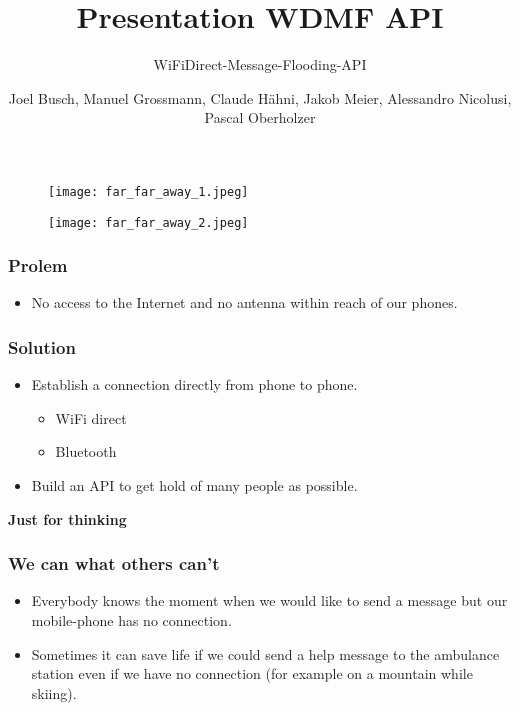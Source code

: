 \documentclass[11pt]{beamer}
\author{Joel Busch, Manuel Grossmann, Claude Hähni, Jakob Meier, Alessandro Nicolusi, Pascal Oberholzer}
\title{Presentation WDMF API}
\subtitle{WiFiDirect-Message-Flooding-API}
\institute{}
\date{}
\begin{document}
	\maketitle
	
	\begin{frame}
		\begin{figure}
			\texttt{[image: far\_far\_away\_1.jpeg]}
		\end{figure}
	\end{frame}
	
	\begin{frame}
		\begin{figure}
			\texttt{[image: far\_far\_away\_2.jpeg]}
		\end{figure}
	\end{frame}
	
	\begin{frame}
		\frametitle{Prolem}
		\begin{itemize}
			\item No access to the Internet and no antenna within reach of our phones.
		\end{itemize}
	\end{frame}
	
	\begin{frame}
		\frametitle{Solution}
		\begin{itemize}
			\item Establish a connection directly from phone to phone.
			\begin{itemize}
				\item WiFi direct
				\item Bluetooth
			\end{itemize}
			\item Build an API to get hold of many people as possible.
		\end{itemize}
	\end{frame}
	
	\begin{frame}
		\textbf{Just for thinking}
	\end{frame}
	
	\begin{frame}
		\frametitle{We can what others can't}
		\begin{itemize}
			\item Everybody knows the moment when we would like to send a message but our mobile-phone has no connection.
			\item Sometimes it can save life if we could send a help message to the ambulance station even if we have no connection (for example on a mountain while skiing).
		\end{itemize}
	\end{frame}
	
\end{document}
